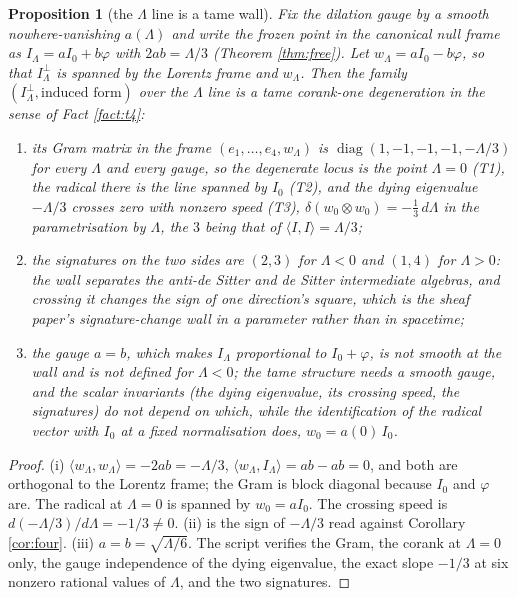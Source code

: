 \documentclass[11pt]{article}
\newtheorem{proposition}[theorem]{Proposition}
\theoremstyle{definition}
\newcommand{\ip}[2]{\langle #1, #2\rangle}
\begin{document}
\begin{proposition}[the $\Lambda$ line is a tame wall]\label{prop:tamewall}
Fix the dilation gauge by a smooth nowhere-vanishing $a(\Lambda)$ and write the frozen point in the canonical null frame as $I_{\Lambda} = a I_{0} + b\varphi$ with $2ab = \Lambda/3$ (Theorem \ref{thm:free}). Let $w_{\Lambda} = aI_{0} - b\varphi$, so that $I_{\Lambda}^{\perp}$ is spanned by the Lorentz frame and $w_{\Lambda}$. Then the family $(I_{\Lambda}^{\perp}, \text{induced form})$ over the $\Lambda$ line is a tame corank-one degeneration in the sense of Fact \ref{fact:t4}:
\begin{enumerate}
\item[(i)] its Gram matrix in the frame $(e_{1}, \ldots, e_{4}, w_{\Lambda})$ is $\operatorname{diag}(1,-1,-1,-1,-\Lambda/3)$ for every $\Lambda$ and every gauge, so the degenerate locus is the point $\Lambda = 0$ (T1), the radical there is the line spanned by $I_{0}$ (T2), and the dying eigenvalue $-\Lambda/3$ crosses zero with nonzero speed (T3), $\delta(w_{0} \otimes w_{0}) = -\tfrac13\,d\Lambda$ in the parametrisation by $\Lambda$, the $3$ being that of $\ip{I}{I} = \Lambda/3$;
\item[(ii)] the signatures on the two sides are $(2,3)$ for $\Lambda < 0$ and $(1,4)$ for $\Lambda > 0$: the wall separates the anti-de Sitter and de Sitter intermediate algebras, and crossing it changes the sign of one direction's square, which is the sheaf paper's signature-change wall in a parameter rather than in spacetime;
\item[(iii)] the gauge $a = b$, which makes $I_{\Lambda}$ proportional to $I_{0} + \varphi$, is not smooth at the wall and is not defined for $\Lambda < 0$; the tame structure needs a smooth gauge, and the scalar invariants (the dying eigenvalue, its crossing speed, the signatures) do not depend on which, while the identification of the radical vector with $I_{0}$ at a fixed normalisation does, $w_{0} = a(0)\,I_{0}$.
\end{enumerate}
\end{proposition}

\begin{proof}
(i) $\ip{w_{\Lambda}}{w_{\Lambda}} = -2ab = -\Lambda/3$, $\ip{w_{\Lambda}}{I_{\Lambda}} = ab - ab = 0$, and both are orthogonal to the Lorentz frame; the Gram is block diagonal because $I_{0}$ and $\varphi$ are. The radical at $\Lambda = 0$ is spanned by $w_{0} = aI_{0}$. The crossing speed is $d(-\Lambda/3)/d\Lambda = -1/3 \neq 0$. (ii) is the sign of $-\Lambda/3$ read against Corollary \ref{cor:four}. (iii) $a = b = \sqrt{\Lambda/6}$. The script verifies the Gram, the corank at $\Lambda = 0$ only, the gauge independence of the dying eigenvalue, the exact slope $-1/3$ at six nonzero rational values of $\Lambda$, and the two signatures.
\end{proof}
\end{document}
